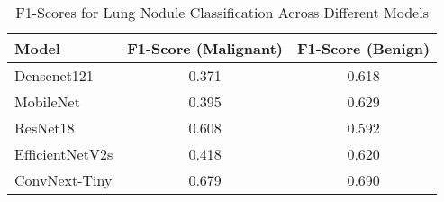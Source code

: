 \begin{table}[htbp]
    \centering
    \label{tab:classification-performances}
    \begin{tabular}{lcc}
        \toprule
        \textbf{Model} & \textbf{F1-Score (Malignant)} & \textbf{F1-Score (Benign)} \\
        \midrule
        Densenet121      & 0.371 & 0.618 \\
        MobileNet        & 0.395 & 0.629 \\
        ResNet18         & 0.608 & 0.592 \\
        EfficientNetV2s  & 0.418 & 0.620 \\
        \rowcolor{yellow!20}
        ConvNext-Tiny         & 0.679 & 0.690 \\
        \bottomrule
    \end{tabular}
    \caption{F1-Scores for Lung Nodule Classification Across Different Models}
\end{table}